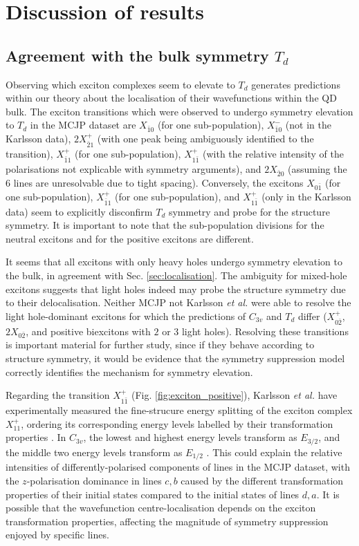 \section{Discussion of results}

\subsection{Agreement with the bulk symmetry $T_d$}
Observing which exciton complexes seem to elevate to $T_d$ generates predictions within our theory about the localisation of their wavefunctions within the QD bulk. The exciton transitions which were observed to undergo symmetry elevation to $T_d$ in the MCJP dataset are $X_{\bar{1}0}$ (for one sub-population), $X^-_{\bar{1}0}$ (not in the Karlsson data), $2X^+_{\bar{2}1}$ (with one peak being ambiguously identified to the transition), $X^+_{\bar{1}1}$ (for one sub-population),  $X^+_{1\bar{1}}$ (with the relative intensity of the polarisations not explicable with symmetry arguments), and $2X_{\bar{2}0}$ (assuming the $6$ lines are unresolvable due to tight spacing). Conversely, the excitons $X_{0\bar{1}}$ (for one sub-population), $X^+_{\bar{1}1}$ (for one sub-population), and $X^+_{1\bar{1}}$ (only in the Karlsson data) seem to explicitly disconfirm $T_d$ symmetry and probe for the structure symmetry. It is important to note that the sub-population divisions for the neutral excitons and for the positive excitons are different.

It seems that all excitons with only heavy holes undergo symmetry elevation to the bulk, in agreement with Sec. \ref{sec:localisation}. The ambiguity for mixed-hole excitons suggests that light holes indeed may probe the structure symmetry due to their delocalisation. Neither MCJP not Karlsson \textit{et al.} were able to resolve the light hole-dominant excitons for which the predictions of $C_{3v}$ and $T_d$ differ ($X^+_{0\bar{2}}$, $2X_{0\bar{2}}$, and positive biexcitons with $2$ or $3$ light holes). Resolving these transitions is important material for further study, since if they behave according to structure symmetry, it would be evidence that the symmetry suppression   model correctly identifies the mechanism for symmetry elevation.

Regarding the transition $X^+_{1\bar{1}}$ (Fig. \ref{fig:exciton_positive}), Karlsson \textit{et al.} have experimentally measured the fine-strucure energy splitting of the exciton complex $X^+_{11}$, ordering its corresponding energy levels labelled by their transformation properties \cite[p. 16]{karlsson}. In $C_{3v}$, the lowest and highest energy levels transform as $E_{3/2}$, and the middle two energy levels transform as $E_{1/2}$ \cite[Fig. 17]{karlsson}. This could explain the relative intensities of differently-polarised components of lines in the MCJP dataset, with the $z$-polarisation dominance in lines $c,b$ caused by the different transformation properties of their initial states compared to the initial states of lines $d,a$. It is possible that the wavefunction centre-localisation depends on the exciton transformation properties, affecting the magnitude of symmetry suppression enjoyed by specific lines.

